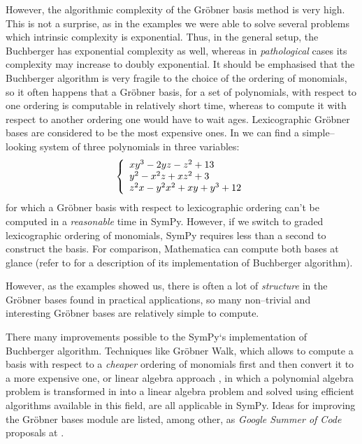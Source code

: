 However, the algorithmic complexity of the Gröbner basis method is very high. This is not a
surprise, as in the examples we were able to solve several problems which intrinsic complexity
is exponential. Thus, in the general setup, the Buchberger has exponential complexity as well,
whereas in \emph{pathological} cases its complexity may increase to doubly exponential. It should be
emphasised that the Buchberger algorithm is very fragile to the choice of the ordering of
monomials, so it often happens that a Gröbner basis, for a set of polynomials, with respect
to one ordering is computable in relatively short time, whereas to compute it with respect to
another ordering one would have to wait ages. Lexicographic Gröbner bases are considered to
be the most expensive ones. In \cite{Buchberger2001systems} we can find a simple--looking system
of three polynomials in three variables:
\begin{gather}
\begin{split}\left\{
\begin{array}{l}
    x y^3 - 2 y z - z^2 + 13          \\
    y^2 - x^2 z + x z^2 + 3           \\
    z^2 x - y^2 x^2 + x y + y^3 + 12
\end{array}
\right.\end{split}\notag
\end{gather}
for which a Gröbner basis with respect to lexicographic ordering can't be computed in a \emph{reasonable}
time in SymPy. However, if we switch to graded lexicographic ordering of monomials, SymPy requires
less than a second to construct the basis. For comparison, Mathematica can compute both bases at glance
(refer to \cite{Mathematica2009internal} for a description of its implementation of Buchberger algorithm).

However, as the examples showed us, there is often a lot of \emph{structure} in the Gröbner bases found
in practical applications, so many non--trivial and interesting Gröbner bases are relatively simple
to compute.

There many improvements possible to the SymPy`s implementation of Buchberger algorithm. Techniques like
Gröbner Walk, which allows to compute a basis with respect to a \emph{cheaper} ordering of monomials first
and then convert it to a more expensive one, or linear algebra approach \cite{Faugere1999f4}, in which a
polynomial algebra problem is transformed in into a linear algebra problem and solved using efficient
algorithms available in this field, are all applicable in SymPy. Ideas for improving the Gröbner
bases module are listed, among other, as \emph{Google Summer of Code} proposals at \cite{SymPyGSoC2010}.

